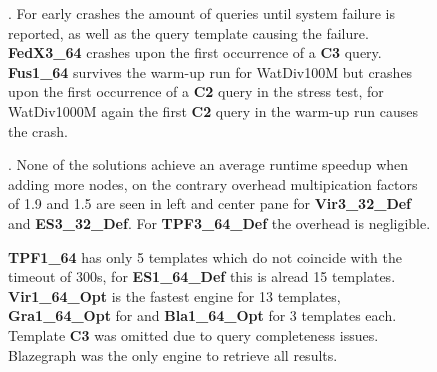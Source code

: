 \documentclass[twocolumn]{bmcart}%
\def\texttt{[image: ]}
\begin{document}
\begin{backmatter}
\begin{figure}[ht!]
	\centering
	\caption{. For early crashes the amount of queries until system failure is reported, as well as the query template causing the failure. \textbf{FedX3\_64} crashes upon the first occurrence of a \textbf{C3} query. \textbf{Fus1\_64} survives the warm-up run for WatDiv100M but crashes upon the first occurrence of a \textbf{C2} query in the stress test, for WatDiv1000M again the first \textbf{C2} query in the warm-up run causes the crash.}
	\label{fig:Fig03_BenchmarkSurvival_Other_Watdiv_Default}
\end{figure}   

\begin{figure}[ht!]
	\centering
	\caption{. None of the solutions achieve an average runtime speedup when adding more nodes, on the contrary overhead multipication factors of 1.9 and 1.5 are seen in left and center pane for \textbf{Vir3\_32\_Def} and \textbf{ES3\_32\_Def}. For \textbf{TPF3\_64\_Def} the overhead is negligible.}
	\label{fig:Fig04_WatdivHorizontalScaling}
\end{figure}

\begin{figure}[ht!]
	\centering
	\caption{ \textbf{TPF1\_64} has only 5 templates which do not coincide with the timeout of 300s, for \textbf{ES1\_64\_Def} this is alread 15 templates.
		\textbf{Vir1\_64\_Opt} is the fastest engine for 13 templates, \textbf{Gra1\_64\_Opt} for and \textbf{Bla1\_64\_Opt} for 3 templates each. Template \textbf{C3} was omitted due to query completeness issues. Blazegraph was the only engine to retrieve all results. } 
	\label{fig:Fig05_WatdivTemplates}
\end{figure}
 

\end{backmatter}
\end{document}
